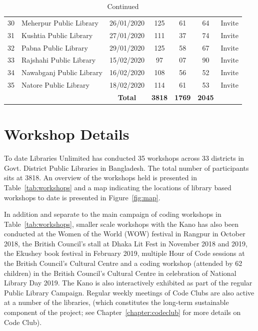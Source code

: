 \documentclass[12pt]{report} %
\newcommand{\numberofworkshops}{35 }
\newcommand{\numberofdistricts}{33 }
\begin{document}
\begin{table}[ht]
\begin{tabular}{l l c c c c c}
30 & Meherpur Public Library & 26/01/2020 & 125 & 61 & 64 & Invite \\
31 & Kushtia Public Library & 27/01/2020 & 111  & 37 & 74 & Invite \\
32 & Pabna Public Library & 29/01/2020 & 125 & 58 & 67 & Invite \\
33 & Rajshahi Public Library & 15/02/2020 & 97 & 07 & 90 & Invite \\
34 & Nawabganj Public Library & 16/02/2020 & 108 & 56 & 52 & Invite \\
35 & Natore Public Library & 18/02/2020 & 114 & 61 & 53 & Invite \\
\hline %
 && \textbf{Total} & \textbf{3818} & \textbf{1769} & \textbf{2045} & \\ %
\hline%
\end{tabular}
\caption[]{Continued}
\end{table}

\section{Workshop Details} %
To date Libraries Unlimited has conducted \numberofworkshops workshops across \numberofdistricts districts in Govt. District Public Libraries in Bangladesh. The total number of participants sits at 3818. An overview of the workshops held is presented in Table~\ref{tab:workshops} and a map indicating the locations of library based workshops to date is presented in Figure~\ref{fig:map}.

In addition and separate to the main campaign of coding workshops in Table~\ref{tab:workshops}, smaller scale workshops with the Kano has also been conducted at the Women of the World (WOW) festival in Rangpur in October 2018, the British Council's stall at Dhaka Lit Fest in November 2018 and 2019, the Ekushey book festival in February 2019, multiple Hour of Code sessions at the British Council's Cultural Centre and a coding workshop (attended by 62 children) in the British Council's Cultural Centre in celebration of National Library Day 2019. The Kano is also interactively exhibited as part of the regular Public Library Campaign. Regular weekly meetings of Code Clubs are also active at a number of the libraries, (which constitutes the long-term sustainable component of the project; see Chapter~\ref{chapter:codeclub} for more details on Code Club). 
\end{document}

